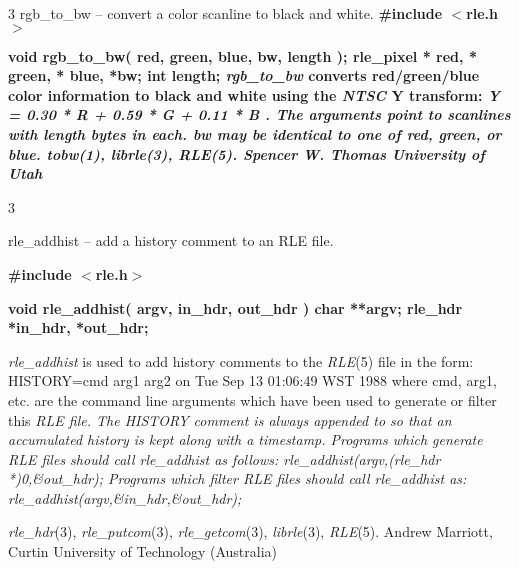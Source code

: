 %
%
%
 3
rgb\_to\_bw -- convert a color scanline to black and white.
\bf
\#include $<$rle.h$>$
\par\vspace{1.0\baselineskip}
\bf
void rgb\_to\_bw( red, green, blue, bw, length );
\nwl
\bf
rle\_pixel * red, * green, * blue, *bw;
\nwl
\bf
int length;
{\it rgb\_to\_bw}
converts red/green/blue color information to black and white using the 
{\it NTSC} Y
transform:
\nwl
\ind{0.5in}
\it
Y = 0.30 * R + 0.59 * G + 0.11 * B
 .
The arguments point to scanlines with
{\it length}
bytes in each.
{\it bw}
may be identical to one of
{\it red}{\rm ,}
{\it green}{\rm ,}
or
{\it blue}{\rm .}
{\it tobw}{\rm (1),}
{\it librle}{\rm (3),}
{\it RLE}{\rm (5).}
Spencer W. Thomas
\nwl
University of Utah
\newpage


%
%
%
 3

rle\_addhist -- add a history comment to an RLE file.

\bf
\#include $<$rle.h$>$
\par\vspace{1.0\baselineskip}
\bf
void  rle\_addhist( argv, in\_hdr, out\_hdr )
\nwl
\bf
char **argv;
\nwl
\bf
rle\_hdr *in\_hdr, *out\_hdr;


{\it rle\_addhist}
is used to add history comments to the 
{\it RLE}{\rm (5)}
file in the form:
\nwl
	HISTORY=cmd arg1 arg2 on Tue Sep 13 01:06:49 WST 1988
\nwl
where cmd, arg1, etc. are the command line arguments which have been
used to generate or filter this %
\it RLE \rm%
file. The HISTORY comment is
always appended to so that an accumulated history is kept along with a
timestamp.  Programs which generate %
\it RLE \rm%
files should call
{\it rle\_addhist}
as follows:
\nwl
	rle\_addhist(argv,(rle\_hdr *)0,\&out\_hdr);
\nwl
Programs which filter %
\it RLE \rm%
files should call 
{\it rle\_addhist}
as:
\nwl
	rle\_addhist(argv,\&in\_hdr,\&out\_hdr);
\raggedright
{\it rle\_hdr}{\rm (3),}
{\it rle\_putcom}{\rm (3),}
{\it rle\_getcom}{\rm (3),}
{\it librle}{\rm (3),}
{\it RLE}{\rm (5).}
Andrew Marriott,
\nwl
Curtin University of Technology (Australia)
\newpage


